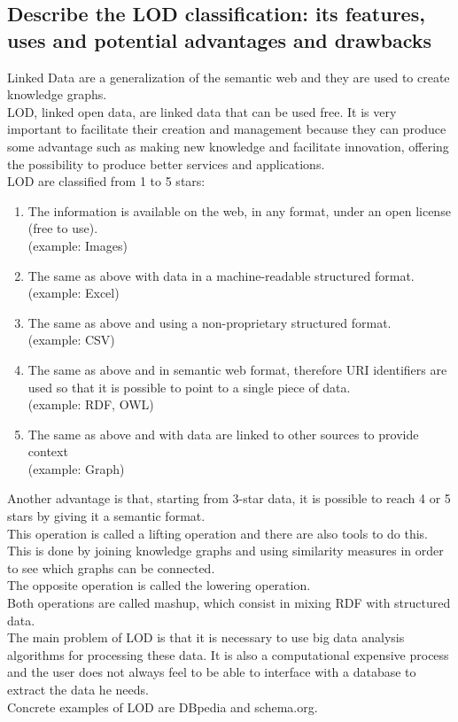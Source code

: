 \subsection{Describe the LOD classification: its features, uses and potential advantages and drawbacks}
Linked Data are a generalization of the semantic web and they are used to
create knowledge graphs.\\
LOD, linked open data, are linked data that can be used free.
It is very important to facilitate their creation and management because they can produce some advantage such as
making new knowledge and facilitate innovation, offering the possibility
to produce better services and applications.\\
LOD are classified from 1 to 5 stars:
\begin{enumerate}
    \item The information is available on the web, in any format, under an open license (free to use).
    \\(example: Images)
    \item The same as above with data in a machine-readable structured format.
    \\(example: Excel)
    \item The same as above and using a non-proprietary structured format.
    \\(example: CSV)
    \item The same as above and in semantic web format,
    therefore URI identifiers are used so that it is possible to point to
    a single piece of data.
    \\(example: RDF, OWL)
    \item The same as above and with data are linked to other sources to provide context\\
    (example: Graph)
\end{enumerate}
Another advantage is that, starting from 3-star data, it is possible to reach 4 or 5 stars by
giving it a semantic format.\\
This operation is called a lifting operation and there are also tools
to do this. This is done by joining knowledge graphs and using
similarity measures in order to see which graphs can be connected.\\
The opposite operation is called the lowering operation.\\
Both operations are called mashup, which consist in mixing
RDF with structured data.\\
The main problem of LOD is that it is necessary to use big data
analysis algorithms for processing these data. It is also a
computational expensive process and the user does not always feel
to be able to interface with a database to extract the data he needs.\\
Concrete examples of LOD are DBpedia and schema.org.

